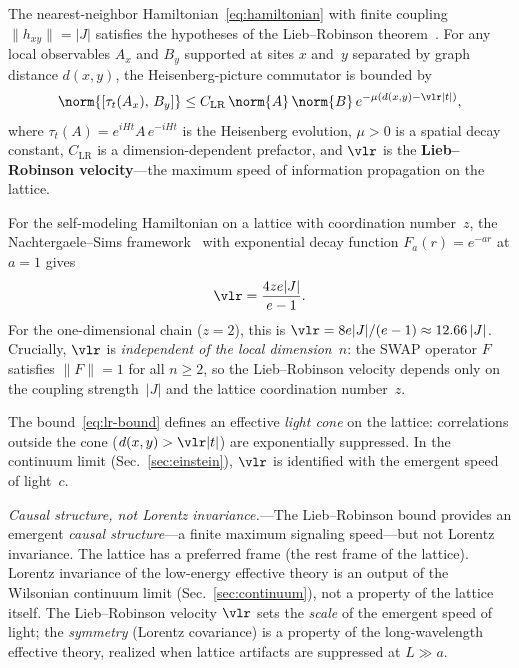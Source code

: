 The nearest-neighbor Hamiltonian~\eqref{eq:hamiltonian} with finite
coupling $\|h_{xy}\| = |J|$ satisfies the hypotheses of the
Lieb--Robinson theorem~\cite{LiebRobinson1972, NachtergaeleSims2006}.
For any local observables $A_x$ and $B_y$ supported at sites $x$
and~$y$ separated by graph distance $d(x,y)$, the Heisenberg-picture
commutator is bounded by
\begin{equation}
  \norm{[\tau_t(A_x),\, B_y]}
  \leq C_{\mathrm{LR}}\, \norm{A}\, \norm{B}\,
  e^{-\mu(d(x,y) - \vlr |t|)},
  \label{eq:lr-bound}
\end{equation}
where $\tau_t(A) = e^{iHt} A\, e^{-iHt}$ is the Heisenberg evolution,
$\mu > 0$ is a spatial decay constant, $C_{\mathrm{LR}}$ is a
dimension-dependent prefactor, and $\vlr$ is the \textbf{Lieb--Robinson
velocity}---the maximum speed of information propagation on the
lattice.

For the self-modeling Hamiltonian on a lattice with coordination
number~$z$, the Nachtergaele--Sims
framework~\cite{NachtergaeleSims2006} with exponential decay function
$F_a(r) = e^{-ar}$ at $a = 1$ gives
\begin{equation}
  \vlr = \frac{4ze|J|}{e - 1}.
  \label{eq:vlr}
\end{equation}
For the one-dimensional chain ($z = 2$), this is $\vlr = 8e|J|/(e-1)
\approx 12.66\,|J|$.  Crucially, $\vlr$ is \emph{independent of the
local dimension~$n$}: the SWAP operator $F$ satisfies $\|F\| = 1$ for
all $n \geq 2$, so the Lieb--Robinson velocity depends only on the
coupling strength~$|J|$ and the lattice coordination number~$z$.

The bound~\eqref{eq:lr-bound} defines an effective \emph{light cone}
on the lattice: correlations outside the cone ($d(x,y) > \vlr |t|$)
are exponentially suppressed.  In the continuum limit
(Sec.~\ref{sec:einstein}), $\vlr$ is identified with the emergent
speed of light~$c$.

\emph{Causal structure, not Lorentz invariance.}---The Lieb--Robinson
bound provides an emergent \emph{causal structure}---a finite maximum
signaling speed---but not Lorentz invariance.  The lattice has a
preferred frame (the rest frame of the lattice).  Lorentz invariance
of the low-energy effective theory is an output of the Wilsonian
continuum limit (Sec.~\ref{sec:continuum}), not a property of the
lattice itself.  The Lieb--Robinson velocity $\vlr$ sets the
\emph{scale} of the emergent speed of light; the \emph{symmetry}
(Lorentz covariance) is a property of the long-wavelength effective
theory, realized when lattice artifacts are suppressed at
$L \gg a$.
